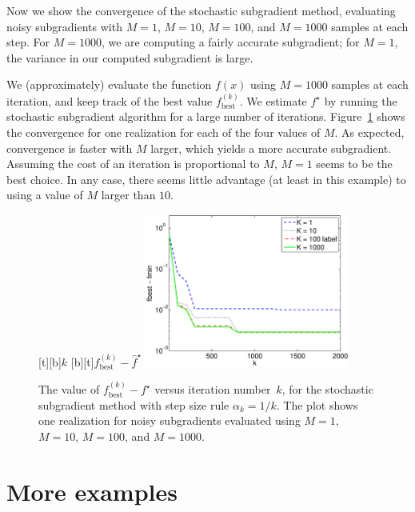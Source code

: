 \documentclass[12pt]{article}
\begin{document}
Now we show the convergence of the stochastic subgradient method,
evaluating noisy subgradients with $M=1$, $M=10$, $M=100$, and
$M=1000$ samples at each step.
For $M=1000$, we are computing a fairly accurate subgradient; for
$M=1$, the variance in our computed subgradient is large.

We (approximately) evaluate
the function $f(x)$ using $M=1000$ samples at each iteration,
and keep track of the best value $f^{(k)}_\mathrm{best}$.
We estimate $f^\star$
by running the stochastic subgradient algorithm for a large
number of iterations.
Figure~\ref{f-stoch-pwl-fbest} shows the convergence
for one realization for each of the four values of $M$.
As expected, convergence is faster with $M$ larger, which yields
a more accurate subgradient.
Assuming the cost of an iteration is proportional to $M$,
$M=1$ seems to be the best choice.
In any case, there seems little advantage (at least
in this example) to using a value of $M$ larger than $10$.

\begin{figure}
\begin{center}
[t][b]{$k$}
[b][t]{$f_\mathrm{best}^{(k)} -\hat f^\star$}
\includegraphics[width=0.6\textwidth]{matlab/expected_avgpwl_fbest}
\end{center}
\caption{The value of $f_\mathrm{best}^{(k)} - f^\star$
versus iteration number~$k$, for the stochastic subgradient method
with step size rule $\alpha_k=1/k$.
The plot shows one realization for noisy subgradients  evaluated
using $M=1$, $M=10$, $M=100$, and $M=1000$.}
\label{f-stoch-pwl-fbest}
\end{figure}

\section{More examples}
\end{document}

